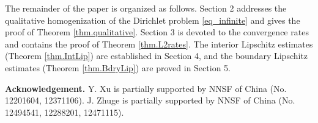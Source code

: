 \documentclass[reqno,12pt]{amsart} %
\theoremstyle{definition}
\theoremstyle{remark}
\numberwithin{equation}{section}
\newcommand{\e}{\varepsilon}
\newcommand{\doublerightarrow}{%
  \mathrel{%
    \mathchoice
      {\rightarrow\mspace{-10mu}\rightarrow} %
      {\rightarrow\mspace{-10mu}\rightarrow} %
      {\rightarrow\mspace{-10mu}\rightarrow} %
      {\rightarrow\mspace{-10mu}\rightarrow} %
  }%
}
\begin{document}
The remainder of the paper is organized as follows.  Section 2 addresses the qualitative homogenization of the Dirichlet problem \eqref{eq_infinite} and
gives the proof of Theorem \ref{thm.qualitative}.
Section 3 is devoted to the convergence rates and contains the proof of Theorem \ref{thm.L2rates}.
The interior Lipschitz estimates (Theorem \ref{thm.IntLip}) are established in Section 4, and
 the boundary Lipschitz estimates (Theorem \ref{thm.BdryLip}) are proved in Section 5.

 \textbf{Acknowledgement.} Y. Xu is partially supported by NNSF of China (No. 12201604, 12371106). J. Zhuge is partially supported by NNSF of China (No. 12494541, 12288201, 12471115). 





\end{document}
